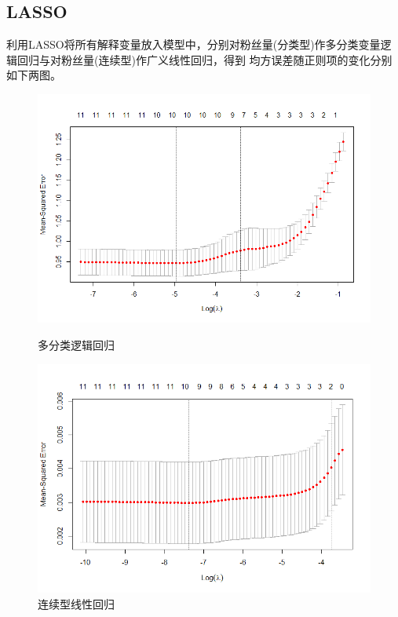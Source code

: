 \documentclass{ctexart}
\begin{document}
\subsection{LASSO}
利用LASSO将所有解释变量放入模型中，分别对粉丝量(分类型)作多分类变量逻辑回归与对粉丝量(连续型)作广义线性回归，得到
均方误差随正则项的变化分别如下两图。
\begin{figure}[htbp]
    \begin{minipage}[t]{0.48\textwidth}
        \centering
        \includegraphics[width=\textwidth]{EDA/lasso_multinomial.png}
        \caption{多分类逻辑回归}
    \end{minipage}
    \begin{minipage}[t]{0.48\textwidth}
        \centering
        \includegraphics[width=\textwidth]{EDA/lasso_continuous.png}
        \caption{连续型线性回归}
    \end{minipage}
\end{figure}\\
\end{document}
